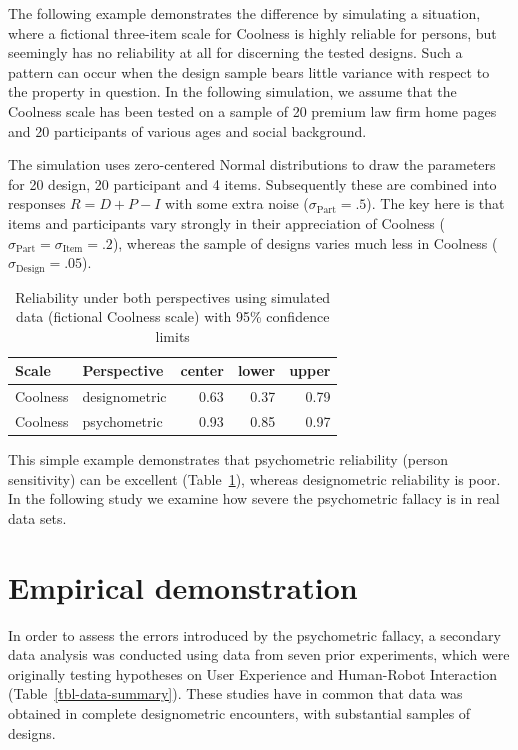 \documentclass[
  authoryear,
  review]{elsarticle}
\begin{document}
The following example demonstrates the difference by simulating a
situation, where a fictional three-item scale for Coolness is highly
reliable for persons, but seemingly has no reliability at all for
discerning the tested designs. Such a pattern can occur when the design
sample bears little variance with respect to the property in question.
In the following simulation, we assume that the Coolness scale has been
tested on a sample of 20 premium law firm home pages and 20 participants
of various ages and social background.

The simulation uses zero-centered Normal distributions to draw the
parameters for 20 design, 20 participant and 4 items. Subsequently these
are combined into responses \(R = D + P - I\) with some extra noise
(\(\sigma_\textrm{Part} = .5\)). The key here is that items and
participants vary strongly in their appreciation of Coolness
(\(\sigma_\textrm{Part} = \sigma_\textrm{Item} = .2\)), whereas the
sample of designs varies much less in Coolness
(\(\sigma_\textrm{Design} = .05\)).

\begin{longtable}[]{@{}llrrr@{}}

\caption{\label{tbl-simulated-reliability}Reliability under both
perspectives using simulated data (fictional Coolness scale) with 95\%
confidence limits}

\tabularnewline

\toprule\noalign{}
Scale & Perspective & center & lower & upper \\
\midrule\noalign{}
\endhead
\bottomrule\noalign{}
\endlastfoot
Coolness & designometric & 0.63 & 0.37 & 0.79 \\
Coolness & psychometric & 0.93 & 0.85 & 0.97 \\

\end{longtable}

This simple example demonstrates that psychometric reliability (person
sensitivity) can be excellent (Table~\ref{tbl-simulated-reliability}),
whereas designometric reliability is poor. In the following study we
examine how severe the psychometric fallacy is in real data sets.

\section{Empirical demonstration}\label{empirical-demonstration}

In order to assess the errors introduced by the psychometric fallacy, a
secondary data analysis was conducted using data from seven prior
experiments, which were originally testing hypotheses on User Experience
and Human-Robot Interaction (Table~\ref{tbl-data-summary}). These
studies have in common that data was obtained in complete designometric
encounters, with substantial samples of designs.
\end{document}
